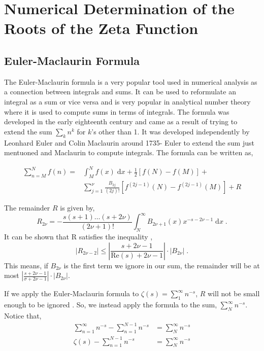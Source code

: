 \documentclass{amsproc}
\newcommand{\be}{\begin{equation}}
\newcommand{\ee}{\end{equation}}
\newcommand{\df}{\; \mathrm{d}}
\theoremstyle{definition}
\theoremstyle{remark}
\numberwithin{equation}{section}
\begin{document}
\section{Numerical Determination of the Roots of the Zeta Function}
\subsection{Euler-Maclaurin Formula}
The Euler-Maclaurin formula is a very popular tool used in numerical analysis as a connection between integrals and sums. It can be used to reformulate an integral as a sum or vice versa and is very popular in analytical number theory where it is used to compute sums in terms of integrals. The formula was developed in the early eighteenth century and came as a result of trying to extend the sum $\sum_{k} n^k$ for $k$'s other than 1. It was developed independently by Leonhard Euler and Colin Maclaurin around 1735- Euler to extend the sum just mentuoned and Maclaurin to compute integrals. The formula can be written as,

\begin{align}
\sum_{n = M}^{N} f(n) = &\int_M^N f(x) \df x + \frac{1}{2} \left[ f(N) - f(M) \right] + \\
&\sum_{j = 1}^{\nu} \frac{B_{2j}}{ (2j)! } \left[ f^{( 2j - 1)}(N) - f^{(2j - 1)} (M) \right] + R
\end{align}

The remainder $R$ is given by, 
\be 
R_{2 \nu} = - \frac{ s (s + 1) \ldots (s + 2 \nu) }{ (2 \nu + 1)! } \int_N^{\infty} B_{2 \nu + 1}(x) x^{-s - 2\nu - 1} \df x \;.
\ee
It can be shown that R satisfies the inequality \cite{},
\be
\left| R_{2 \nu - 2} \right| \le \left| \frac{s + 2 \nu - 1}{ \mathrm{Re}(s) + 2\nu - 1 } \right|  \cdot \left| B_{2 \nu} \right| \;.
\ee
This means, if $B_{2 \nu}$ is the first term we ignore in our sum, the remainder will be at most $\left| \frac{s + 2 \nu - 1}{ \sigma + 2\nu - 1 } \right|  \cdot \left| B_{2 \nu} \right|$. 

If we apply the Euler-Maclaurin formula to $\zeta(s) = \sum_{1}^{\infty} n^{-s}$, $R$ will not be small enough to be ignored \cite{}. So, we instead apply the formula to the sum, $\sum_{N}^{\infty} n^{-s}$. Notice that,
\begin{align*}
 \sum_{n = 1}^{\infty} n^{-s} - \sum_{n = 1}^{N - 1} n^{-s} &= \sum_{N}^{\infty} n^{-s} \\
 \zeta(s) - \sum_{n = 1}^{N - 1} n^{-s} &= \sum_{N}^{\infty} n^{-s} 
\end{align*}
\end{document}

